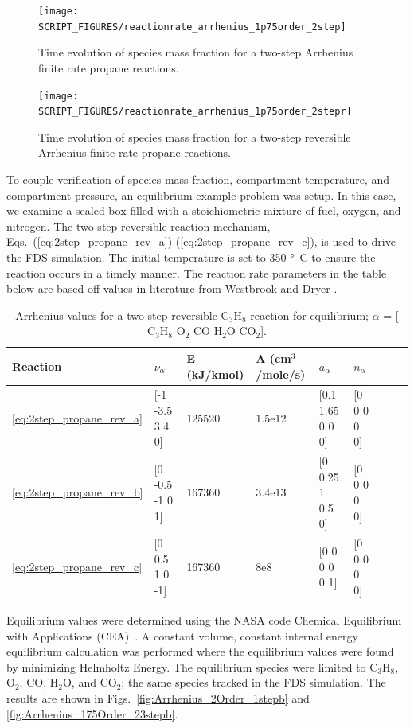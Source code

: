 \documentclass[11pt]{book}
\begin{document}
\begin{figure}[h!]
\centering
\texttt{[image: SCRIPT\_FIGURES/reactionrate\_arrhenius\_1p75order\_2step]}
\caption[Species evolution in a 1.75-order 2-step finite rate reaction]{Time evolution of species mass fraction for a two-step Arrhenius finite rate propane reactions.}
\label{fig:Arrhenius_175Order_2step}
\end{figure}

\begin{figure}[h!]
\centering
\texttt{[image: SCRIPT\_FIGURES/reactionrate\_arrhenius\_1p75order\_2stepr]}
\caption[Species evolution in a 1.75-order 2-step reversible finite rate reaction]{Time evolution of species mass fraction for a two-step reversible Arrhenius finite rate propane reactions.}
\label{fig:Arrhenius_175Order_2stepR}
\end{figure}

To couple verification of species mass fraction, compartment temperature, and compartment pressure, an equilibrium example problem was setup. In this case, we examine a sealed box filled with a stoichiometric mixture of fuel, oxygen, and nitrogen. The two-step reversible reaction mechanism, Eqs.~(\ref{eq:2step_propane_rev_a})-(\ref{eq:2step_propane_rev_c}), is used to drive the FDS simulation. The initial temperature is set to 350 \si{\degree C} to ensure the reaction occurs in a timely manner. The reaction rate parameters in the table below are based off values in literature from Westbrook and Dryer \cite{Westbrook:1}.
\begin{table}[ht]
\begin{center}
\caption[Arrhenius values for a two-step reversible C$_3$H$_8$ reaction]{Arrhenius values for a two-step reversible C$_3$H$_8$ reaction for equilibrium; $\alpha$ = [$\mathrm{C_3H_8}$ $\mathrm{O_2}$ $\mathrm{CO}$ $\mathrm{H_2O}$ $\mathrm{CO_2}$].}
\label{two_step_eq_rev_c3h8}
\begin{tabular}{|l|l|l|l|l|l|l|l|l|}
\hline Reaction & $\nu_{\alpha}$ & E (kJ/kmol) & A (cm$^3$/mole/s) & $a_{\alpha}$ & $n_{\alpha}$  \\ \hline \hline
\ref{eq:2step_propane_rev_a} & [-1 -3.5 3 4 0] & 125520 & 1.5e12 & [0.1 1.65 0 0 0] & [0 0 0 0 0] \\ \hline
\ref{eq:2step_propane_rev_b} & [0 -0.5 -1 0 1] & 167360 & 3.4e13 & [0 0.25 1 0.5 0] & [0 0 0 0 0] \\ \hline
\ref{eq:2step_propane_rev_c} & [0 0.5 1 0 -1]  & 167360 & 8e8    & [0 0 0 0 0 1]    & [0 0 0 0 0] \\ \hline
\end{tabular}
\end{center}
\end{table}
Equilibrium values were determined using the NASA code Chemical Equilibrium with Applications (CEA)~\cite{Gordon:1994}. A constant volume, constant internal energy equilibrium calculation was performed where the equilibrium values were found by minimizing Helmholtz Energy. The equilibrium species were limited to $\mathrm{C_3H_8}$, $\mathrm{O_2}$, $\mathrm{CO}$, $\mathrm{H_2O}$, and $\mathrm{CO_2}$; the same species tracked in the FDS simulation.  The results are shown in Figs.~\ref{fig:Arrhenius_2Order_1stepb} and \ref{fig:Arrhenius_175Order_23stepb}.
\end{document}
